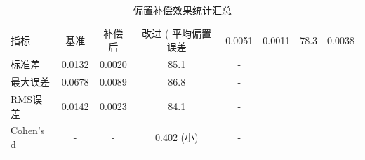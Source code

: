 \begin{table}[h]
\centering
\caption{偏置补偿效果统计汇总}
\begin{tabular}{|l|c|c|c|c|}
\hline
指标 & 基准 & 补偿后 & 改进 (%
\hline
平均偏置误差 & 0.0051 & 0.0011 & 78.3 & 0.0038 \\
标准差 & 0.0132 & 0.0020 & 85.1 & - \\
最大误差 & 0.0678 & 0.0089 & 86.8 & - \\
RMS误差 & 0.0142 & 0.0023 & 84.1 & - \\
Cohen's d & - & - & 0.402 (小) & - \\
\hline
\end{tabular}
\end{table}
